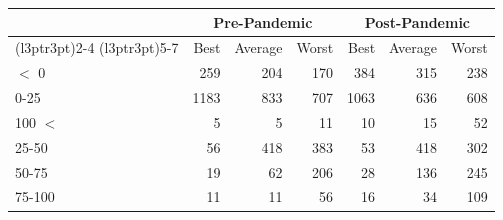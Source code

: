 
\begin{tabular}[t]{lrrrrrr}
\toprule
\multicolumn{1}{c}{ } & \multicolumn{3}{c}{Pre-Pandemic} & \multicolumn{3}{c}{Post-Pandemic} \\
\cmidrule(l{3pt}r{3pt}){2-4} \cmidrule(l{3pt}r{3pt}){5-7}
 & Best & Average & Worst & Best & Average & Worst\\
\midrule
$<$ 0 & 259 & 204 & 170 & 384 & 315 & 238\\
0-25 & 1183 & 833 & 707 & 1063 & 636 & 608\\
100 $<$ & 5 & 5 & 11 & 10 & 15 & 52\\
25-50 & 56 & 418 & 383 & 53 & 418 & 302\\
50-75 & 19 & 62 & 206 & 28 & 136 & 245\\
75-100 & 11 & 11 & 56 & 16 & 34 & 109\\
\bottomrule
\end{tabular}
